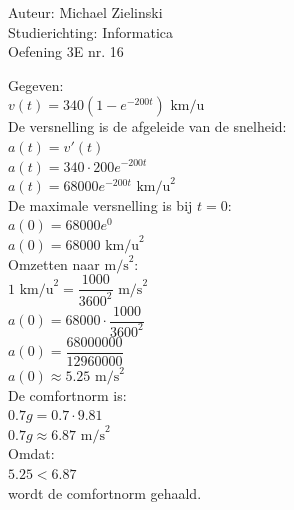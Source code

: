 \documentclass[a4paper]{article}
\begin{document}
  
\noindent \large Auteur: Michael Zielinski \\
\noindent \large Studierichting: Informatica\\
\noindent \large Oefening 3E nr. 16\\

\medskip

\normalsize

Gegeven: \\

$ v(t) = 340(1-e^{-200t}) \text{ km/u} $ \\

De versnelling is de afgeleide van de snelheid: \\

$ a(t) = v'(t) $ \\

$ a(t) = 340 \cdot 200 e^{-200t} $ \\

$ a(t) = 68000e^{-200t} \text{ km/u}^2 $ \\

De maximale versnelling is bij $t=0$: \\

$ a(0) = 68000e^0 $ \\

$ a(0) = 68000 \text{ km/u}^2 $ \\

Omzetten naar $\text{m/s}^2$: \\

$ 1 \text{ km/u}^2 = \dfrac{1000}{3600^2} \text{ m/s}^2 $ \\

$ a(0) = 68000 \cdot \dfrac{1000}{3600^2} $ \\

$ a(0) = \dfrac{68000000}{12960000} $ \\

$ a(0) \approx 5.25 \text{ m/s}^2 $ \\

De comfortnorm is: \\

$ 0.7g = 0.7 \cdot 9.81 $ \\

$ 0.7g \approx 6.87 \text{ m/s}^2 $ \\

Omdat: \\

$ 5.25 < 6.87 $ \\

wordt de comfortnorm gehaald. \\
\end{document}

